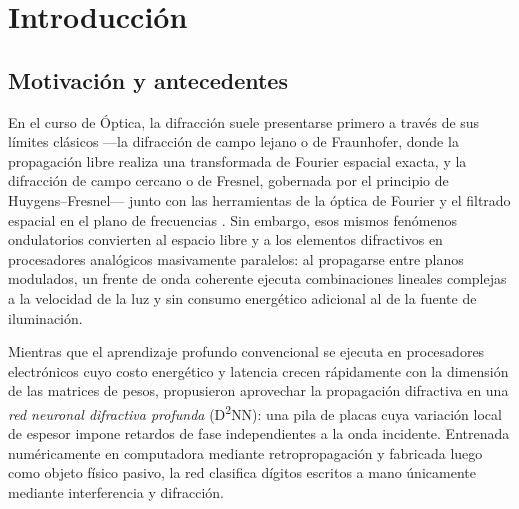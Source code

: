 \chapter{Introducción}\label{cap:intro}

\section{Motivación y antecedentes}

En el curso de Óptica, la difracción suele presentarse primero a través de sus límites
clásicos —la difracción de campo lejano o de Fraunhofer, donde la propagación libre realiza una
transformada de Fourier espacial exacta, y la difracción de campo cercano o de Fresnel,
gobernada por el principio de Huygens--Fresnel— junto con las herramientas de la óptica de
Fourier y el filtrado espacial en el plano de frecuencias \parencite{goodman2005}. Sin embargo,
esos mismos fenómenos ondulatorios convierten al espacio libre y a los elementos difractivos en
procesadores analógicos masivamente paralelos: al propagarse entre planos modulados, un frente
de onda coherente ejecuta combinaciones lineales complejas a la velocidad de la luz y sin
consumo energético adicional al de la fuente de iluminación.

Mientras que el aprendizaje profundo convencional se ejecuta en procesadores electrónicos cuyo
costo energético y latencia crecen rápidamente con la dimensión de las matrices de pesos,
\textcite{lin2018} propusieron aprovechar la propagación difractiva en una \emph{red neuronal
difractiva profunda} (D\textsuperscript{2}NN): una pila de placas cuya variación local de
espesor impone retardos de fase independientes a la onda incidente. Entrenada numéricamente
en computadora mediante retropropagación y fabricada luego como objeto físico pasivo, la red
clasifica dígitos escritos a mano únicamente mediante interferencia y difracción.

